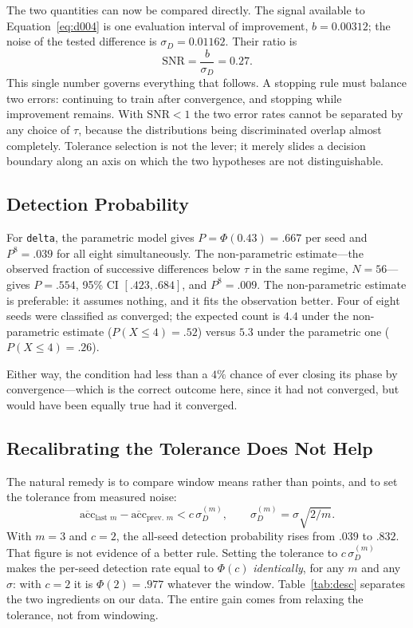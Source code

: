 \documentclass[jou,11pt,donotrepeattitle]{apa7}
\begin{document}
The two quantities can now be compared directly. The signal available to
Equation~\ref{eq:d004} is one evaluation interval of improvement, $b = 0.00312$; the noise of
the tested difference is $\sigma_D = 0.01162$. Their ratio is
%
\begin{equation}
\mathrm{SNR} = \frac{b}{\sigma_D} = 0.27 .
\label{eq:snr}
\end{equation}
%
This single number governs everything that follows. A stopping rule must balance two errors:
continuing to train after convergence, and stopping while improvement remains. With
$\mathrm{SNR} < 1$ the two error rates cannot be separated by any choice of $\tau$, because the
distributions being discriminated overlap almost completely. Tolerance selection is not the
lever; it merely slides a decision boundary along an axis on which the two hypotheses are not
distinguishable.

\subsection{Detection Probability}

For \texttt{delta}, the parametric model gives $P = \Phi(0.43) = .667$ per seed and
$P^{8} = .039$ for all eight simultaneously. The non-parametric estimate---the observed fraction
of successive differences below $\tau$ in the same regime, $N = 56$---gives $P = .554$,
95\% CI $[.423, .684]$, and $P^{8} = .009$. The non-parametric estimate is preferable: it
assumes nothing, and it fits the observation better. Four of eight seeds were classified as
converged; the expected count is $4.4$ under the non-parametric estimate ($P(X \leq 4) = .52$)
versus $5.3$ under the parametric one ($P(X \leq 4) = .26$).

Either way, the condition had less than a $4\%$ chance of ever closing its phase by
convergence---which is the correct outcome here, since it had not converged, but would have been
equally true had it converged.

\subsection{Recalibrating the Tolerance Does Not Help}

The natural remedy is to compare window means rather than points, and to set the tolerance from
measured noise:
%
\begin{equation}
\overline{\mathrm{acc}}_{\text{last } m} - \overline{\mathrm{acc}}_{\text{prev. } m} < c\,\sigma_D^{(m)},
\qquad \sigma_D^{(m)} = \sigma\sqrt{2/m} .
\label{eq:fix}
\end{equation}
%
With $m = 3$ and $c = 2$, the all-seed detection probability rises from $.039$ to $.832$. That
figure is not evidence of a better rule. Setting the tolerance to $c\,\sigma_D^{(m)}$ makes the
per-seed detection rate equal to $\Phi(c)$ \emph{identically}, for any $m$ and any $\sigma$: with
$c = 2$ it is $\Phi(2) = .977$ whatever the window. Table~\ref{tab:desc} separates the two
ingredients on our data. The entire gain comes from relaxing the tolerance, not from windowing.
\end{document}
